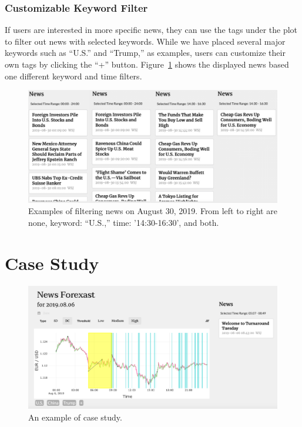 \documentclass[sigconf]{acmart}
\begin{document}
\subsubsection{Customizable Keyword Filter
}
If users are interested in more specific news, they can use the tags under the plot to filter out news with selected keywords.
While we have placed several major keywords such as ``U.S.'' and ``Trump,'' as examples, users can customize their own tags by clicking the ``+'' button.
Figure~\ref{fig:keywords} shows the displayed news based one different keyword and time filters. 

\begin{figure}[h]
  \centering
  \includegraphics[width=\linewidth]{news.png}
  \caption{Examples of filtering news on August 30, 2019. From left to right are none, keyword: ``U.S.,'' time: '14:30-16:30', and both.}
  \Description{}
  \label{fig:keywords}
\end{figure}

\section{Case Study}\label{sec:case}

\begin{figure}[h]
  \centering
  \includegraphics[width=\linewidth]{case.png}
  \caption{An example of case study.}
  \Description{}
  \label{fig:case}
\end{figure}
\end{document}
